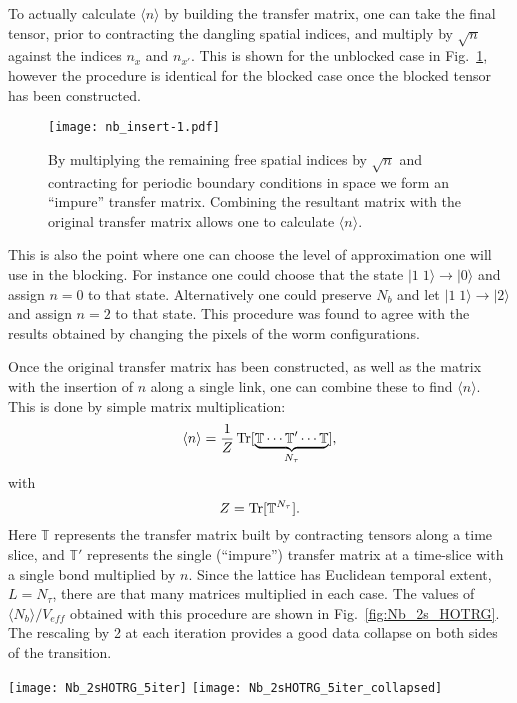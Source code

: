 \documentclass[../main.tex]{subfiles}
\begin{document}
To actually calculate $\langle n \rangle$ by building the transfer matrix, one
can take the final tensor, prior to contracting the dangling spatial indices,
and multiply by $\sqrt{n}$ against the indices $n_{x}$ and $n_{x'}$. This is
shown for the unblocked case in Fig.~\ref{fig:nb}, however the procedure is
identical for the blocked case once the blocked tensor has been constructed.
%
\begin{figure}[htpb]
  \centering
	\texttt{[image: nb\_insert-1.pdf]}
    \caption{By multiplying the remaining free spatial indices by $\sqrt{n}$
    and contracting for periodic boundary conditions in space we form an
    ``impure'' transfer matrix.  Combining the resultant matrix with the
    original transfer matrix allows one to calculate $\langle n \rangle$.}%
\label{fig:nb}
\end{figure}
%
This is also the point where one can choose the level of approximation one will
use in the blocking.  For instance one could choose that the state $|1 \; 1
\rangle \rightarrow |0\rangle$ and assign $n = 0$ to that state.  Alternatively
one could preserve $N_{b}$ and let $|1 \; 1 \rangle \rightarrow |2 \rangle$ and
assign $n = 2$ to that state.  This procedure was found to agree with the
results obtained by changing the pixels of the worm configurations.

Once the original transfer matrix has been constructed, as well as the matrix
with the insertion of $n$ along a single link, one can combine these to find
$\langle n \rangle$.  This is done by simple matrix multiplication:
%
%
\begin{equation}
    \langle n \rangle = \frac{1}{Z} \operatorname{Tr}[\underbrace{\mathbb{T} \cdots
    \mathbb{T}' \cdots \mathbb{T}}_{N_{\tau}}],
\end{equation}
%
%
with
%
%
\begin{equation}
	Z = \operatorname{Tr}[\mathbb{T}^{N_{\tau}}].
\end{equation}
%
%
Here $\mathbb{T}$ represents the transfer matrix built by contracting tensors
along a time slice, and $\mathbb{T}'$ represents the single (``impure'')
transfer matrix at a time-slice with a single bond multiplied by $n$.  Since
the lattice has Euclidean temporal extent, $L = N_{\tau}$, there are that many
matrices multiplied in each case. The values of $\langle N_b\rangle/V_{eff}$
obtained with this procedure are shown in Fig.~\ref{fig:Nb_2s_HOTRG}.  The
rescaling by 2 at each iteration provides a good data collapse on both sides of
the transition.
%
\begin{figure*}[htpb]
    \centering 
    \texttt{[image: Nb\_2sHOTRG\_5iter]}\hfill%
    \texttt{[image: Nb\_2sHOTRG\_5iter\_collapsed]}
    \caption{(a) $\langle N_b\rangle$ vs $(T - 2.46)$ under successive blocking
        steps calculated using 2-state HOTRG. (b) $\langle N_b\rangle$ vs $(T -
        2.46) / L_{eff}$ under successive blocking steps calculated using
        2-state HOTRG. Note that the value of $2.46$ was determined
        qualitatively by choosing the value which gave the best resulting data
        collapse.}%
\label{fig:Nb_2s_HOTRG}
\end{figure*}
%
\end{document}
